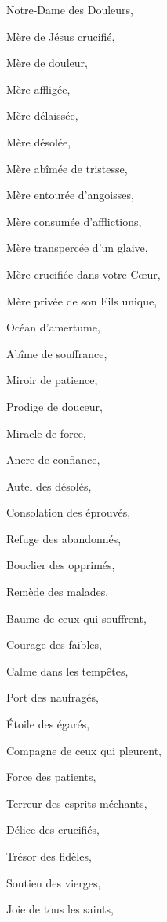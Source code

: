 \documentclass{bibliotheca-missel}
\begin{document}
\begin{litanie}
\item Notre-Dame des Douleurs, \item Mère de Jésus crucifié, \item Mère de douleur, \item Mère affligée, \item Mère délaissée, \item Mère désolée, \item Mère abîmée de tristesse, \item Mère entourée d’angoisses, \item Mère consumée d’afflictions, \item Mère transpercée d’un glaive, \item Mère crucifiée dans votre Cœur, \item Mère privée de son Fils unique, \item Océan d’amertume, \item Abîme de souffrance, \item Miroir de patience, \item Prodige de douceur, \item Miracle de force, \item Ancre de confiance, \item Autel des désolés, \item Consolation des éprouvés, \item Refuge des abandonnés, \item Bouclier des opprimés, \item Remède des malades, \item Baume de ceux qui souffrent, \item Courage des faibles, \item Calme dans les tempêtes, \item Port des naufragés, \item Étoile des égarés, \item Compagne de ceux qui pleurent, \item Force des patients, \item Terreur des esprits méchants, \item Délice des crucifiés, \item Trésor des fidèles, \item Soutien des vierges, \item Joie de tous les saints,
\end{litanie}
\end{document}
